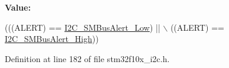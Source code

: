 {\bfseries Value\+:}
\begin{DoxyCode}
(((ALERT) == \hyperlink{group___i2_c___s_m_bus__alert__pin__level_ga6f923166107afb8aad1d7d1a87048d6e}{I2C\_SMBusAlert\_Low}) || \(\backslash\)
                                   ((ALERT) == \hyperlink{group___i2_c___s_m_bus__alert__pin__level_gac3ab64f43ef90f0f83f9c88981aaa862}{I2C\_SMBusAlert\_High}))
\end{DoxyCode}


Definition at line 182 of file stm32f10x\+\_\+i2c.\+h.

